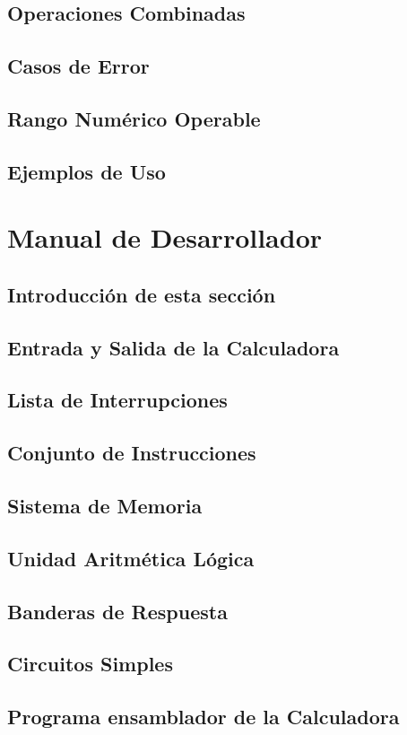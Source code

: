 \documentclass[12pt,letterpaper]{article}
\begin{document}
\subsection{Operaciones Combinadas}
\subsection{Casos de Error}
\subsection{Rango Numérico Operable}
\subsection{Ejemplos de Uso}
\section{Manual de Desarrollador}
\subsection{Introducción de esta sección}
\subsection{Entrada y Salida de la Calculadora}
\subsection{Lista de Interrupciones}
\subsection{Conjunto de Instrucciones}
\subsection{Sistema de Memoria}
\subsection{Unidad Aritmética Lógica}
\subsection{Banderas de Respuesta}
\subsection{Circuitos Simples}
\subsection{Programa ensamblador de la Calculadora}
\end{document}

